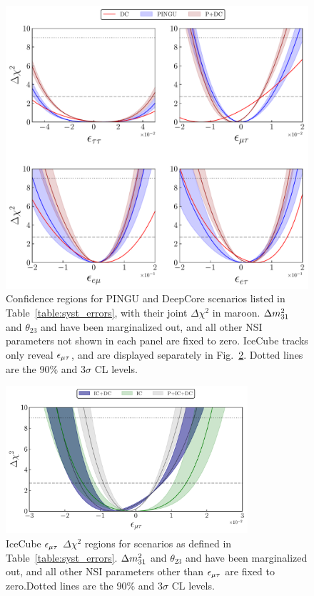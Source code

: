 {\begin{figure}
   \begin{center}
      \includegraphics[scale = 0.7]{figures/joint_3D_NO.pdf}
      \caption{Confidence regions for PINGU and DeepCore scenarios listed in Table~\ref{table:syst_errors}, with their joint $\Delta \chi^2$ in maroon. $\dm[31]$ and $\theta_{23}$ and have been marginalized out, and all other NSI 
      parameters not shown in each panel are fixed to zero. 
      IceCube tracks only reveal $\epsilon_{\mu\tau}$, and are displayed separately in Fig.~\ref{fig:IC_3D}. Dotted lines are the 90\% and $3\sigma$ CL levels.}\label{fig:3D_NO}
   \end{center}
\end{figure} 
\begin{figure}
   \begin{center} 
      \includegraphics[width=0.8\textwidth]{figures/PID_3D_emt.pdf}
      \caption{IceCube $\epsilon_{\mu\tau}$ $\Delta \chi^2$ regions for scenarios as defined in Table~\ref{table:syst_errors}.
    $\dm[31]$ and $\theta_{23}$ and have been marginalized out, and all other NSI 
    parameters other than $\epsilon_{\mu\tau}$ are fixed to zero.Dotted lines are the 90\% and $3\sigma$ CL levels.}\label{fig:IC_3D}
   \end{center}
\end{figure}

}

